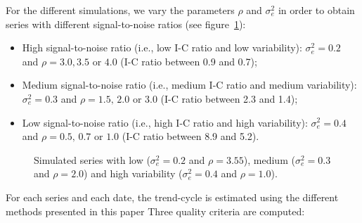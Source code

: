 \documentclass[
]{article}
\newcommand\1{\mathds{1}}
\begin{document}
For the different simulations, we vary the parameters \(\rho\) and
\(\sigma_e^2\) in order to obtain series with different signal-to-noise
ratios (see figure~\ref{fig-graphs-data-simul}):

\begin{itemize}
\item
  High signal-to-noise ratio (i.e., low I-C ratio and low variability):
  \(\sigma_e^2=0.2\) and \(\rho = 3.0, 3.5\) or \(4.0\) (I-C ratio
  between 0.9 and 0.7);
\item
  Medium signal-to-noise ratio (i.e., medium I-C ratio and medium
  variability): \(\sigma_e^2=0.3\) and \(\rho = 1.5,\, 2.0\) or \(3.0\)
  (I-C ratio between 2.3 and 1.4);
\item
  Low signal-to-noise ratio (i.e., high I-C ratio and high variability):
  \(\sigma_e^2=0.4\) and \(\rho = 0.5,\, 0.7\) or \(1.0\) (I-C ratio
  between 8.9 and 5.2).
\end{itemize}

\begin{figure}[H]

\caption{\label{fig-graphs-data-simul}Simulated series with low
(\(\sigma_e^2=0.2\) and \(\rho = 3.55\)), medium (\(\sigma_e^2=0.3\) and
\(\rho = 2.0\)) and high variability (\(\sigma_e^2=0.4\) and
\(\rho = 1.0\)).}


\end{figure}%

For each series and each date, the trend-cycle is estimated using the
different methods presented in this paper Three quality criteria are
computed:
\end{document}
